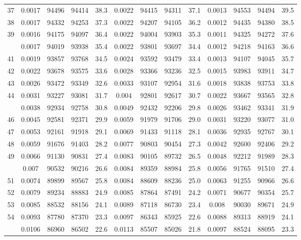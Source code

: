 \documentclass[
  14pt,
]{article}
\begin{document}
\begin{longtable}[t]{lcccccccccccc}
37 & 0.0017 & 94496 & 94414 & 38.3 & 0.0022 & 94415 & 94311 & 37.1 & 0.0013 & 94553 & 94494 & 39.5\\
38 & 0.0017 & 94332 & 94253 & 37.3 & 0.0022 & 94207 & 94105 & 36.2 & 0.0012 & 94435 & 94380 & 38.5\\
39 & 0.0016 & 94175 & 94097 & 36.4 & 0.0022 & 94004 & 93903 & 35.3 & 0.0011 & 94325 & 94272 & 37.6\\
\addlinespace
40 & 0.0017 & 94019 & 93938 & 35.4 & 0.0022 & 93801 & 93697 & 34.4 & 0.0012 & 94218 & 94163 & 36.6\\
41 & 0.0019 & 93857 & 93768 & 34.5 & 0.0024 & 93592 & 93479 & 33.4 & 0.0013 & 94107 & 94045 & 35.7\\
42 & 0.0022 & 93678 & 93575 & 33.6 & 0.0028 & 93366 & 93236 & 32.5 & 0.0015 & 93983 & 93911 & 34.7\\
43 & 0.0026 & 93472 & 93349 & 32.6 & 0.0033 & 93107 & 92954 & 31.6 & 0.0018 & 93838 & 93753 & 33.8\\
44 & 0.0031 & 93227 & 93081 & 31.7 & 0.004 & 92801 & 92617 & 30.7 & 0.0022 & 93667 & 93565 & 32.8\\
\addlinespace
45 & 0.0038 & 92934 & 92758 & 30.8 & 0.0049 & 92432 & 92206 & 29.8 & 0.0026 & 93462 & 93341 & 31.9\\
46 & 0.0045 & 92581 & 92371 & 29.9 & 0.0059 & 91979 & 91706 & 29.0 & 0.0031 & 93220 & 93077 & 31.0\\
47 & 0.0053 & 92161 & 91918 & 29.1 & 0.0069 & 91433 & 91118 & 28.1 & 0.0036 & 92935 & 92767 & 30.1\\
48 & 0.0059 & 91676 & 91403 & 28.2 & 0.0077 & 90803 & 90454 & 27.3 & 0.0042 & 92600 & 92406 & 29.2\\
49 & 0.0066 & 91130 & 90831 & 27.4 & 0.0083 & 90105 & 89732 & 26.5 & 0.0048 & 92212 & 91989 & 28.3\\
\addlinespace
50 & 0.007 & 90532 & 90216 & 26.6 & 0.0084 & 89359 & 88984 & 25.8 & 0.0056 & 91765 & 91510 & 27.4\\
51 & 0.0074 & 89899 & 89567 & 25.8 & 0.0084 & 88609 & 88236 & 25.0 & 0.0063 & 91255 & 90966 & 26.6\\
52 & 0.0079 & 89234 & 88883 & 24.9 & 0.0085 & 87864 & 87491 & 24.2 & 0.0071 & 90677 & 90354 & 25.7\\
53 & 0.0085 & 88532 & 88156 & 24.1 & 0.0089 & 87118 & 86730 & 23.4 & 0.008 & 90030 & 89671 & 24.9\\
54 & 0.0093 & 87780 & 87370 & 23.3 & 0.0097 & 86343 & 85925 & 22.6 & 0.0088 & 89313 & 88919 & 24.1\\
\addlinespace
55 & 0.0106 & 86960 & 86502 & 22.6 & 0.0113 & 85507 & 85026 & 21.8 & 0.0097 & 88524 & 88095 & 23.3\\

\end{longtable}
\end{document}
